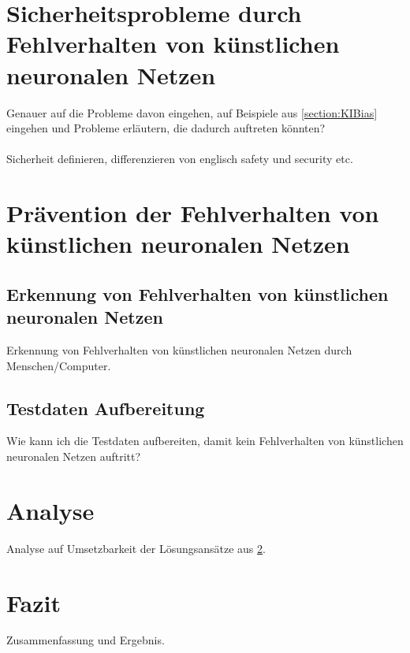 \documentclass[12pt,oneside,a4paper,parskip]{scrbook}
\begin{document}
\chapter{Sicherheitsprobleme durch Fehlverhalten von künstlichen neuronalen Netzen}
Genauer auf die Probleme davon eingehen, auf Beispiele aus \ref{section:KIBias} eingehen und Probleme erläutern, die dadurch auftreten könnten? \\\\
Sicherheit definieren, differenzieren von englisch safety und security etc.

\chapter{Prävention der Fehlverhalten von künstlichen neuronalen Netzen}
\label{chapter:main}
\section{Erkennung von Fehlverhalten von künstlichen neuronalen Netzen}
Erkennung von Fehlverhalten von künstlichen neuronalen Netzen durch Menschen/Computer.
\section{Testdaten Aufbereitung}
Wie kann ich die Testdaten aufbereiten, damit kein Fehlverhalten von künstlichen neuronalen Netzen auftritt?

\chapter{Analyse}
Analyse auf Umsetzbarkeit der Lösungsansätze aus \ref{chapter:main}.

\chapter{Fazit}
Zusammenfassung und Ergebnis.



\backmatter
\listoftables


\cleardoublepage
{}
{}
\printbibliography
\end{document}
